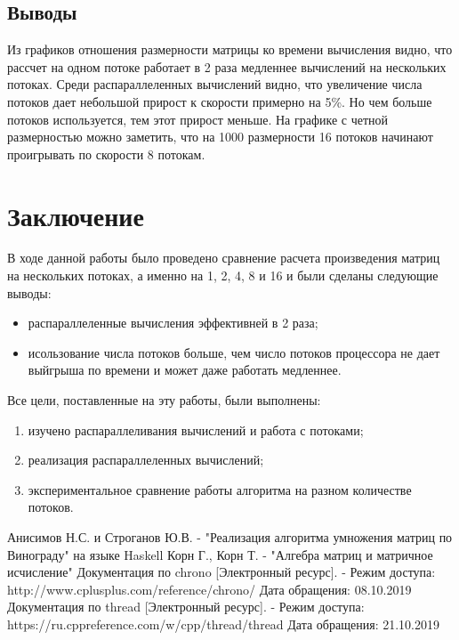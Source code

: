 \documentclass[a4paper,12pt]{article}
\newcommand{\anonsection}[1]{\section*{#1}\addcontentsline{toc}{section}{#1}}
\begin{document}
\subsection{Выводы}

Из графиков отношения размерности матрицы ко времени вычисления видно, что рассчет
на одном потоке работает в 2 раза медленнее вычислений на нескольких потоках.
Среди распараллеленных вычислений видно, что увеличение числа потоков дает
небольшой прирост к скорости примерно на 5\%. Но чем больше потоков используется, тем
этот прирост меньше. На графике с четной размерностью можно заметить, что на 1000
размерности 16 потоков начинают проигрывать по скорости 8 потокам.

\newpage
\anonsection{Заключение}

В ходе данной работы было проведено сравнение расчета произведения матриц на нескольких потоках,
а именно на 1, 2, 4, 8 и 16 и были сделаны следующие выводы:

\begin{itemize}
    \item распараллеленные вычисления эффективней в 2 раза;
    \item исользование числа потоков больше, чем число потоков процессора не дает
        выйгрыша по времени и может даже работать медленнее.
\end{itemize}

Все цели, поставленные на эту работы, были выполнены:

\begin{enumerate}
    \item изучено распараллеливания вычислений и работа с потоками;
    \item реализация распараллеленных вычислений;
    \item экспериментальное сравнение работы алгоритма на разном количестве потоков.
\end{enumerate}

\newpage
{}

\begin{thebibliography}{}
     Анисимов Н.С. и Строганов Ю.В. - "Реализация алгоритма умножения матриц по Винограду"
на языке Haskell
     Корн Г., Корн Т. - "Алгебра матриц и матричное исчисление"
     Документация по chrono [Электронный ресурс]. -
    Режим доступа: http://www.cplusplus.com/reference/chrono/
    Дата обращения: 08.10.2019
     Документация по thread [Электронный ресурс]. -
    Режим доступа: https://ru.cppreference.com/w/cpp/thread/thread
    Дата обращения: 21.10.2019
\end{thebibliography}
\end{document}
